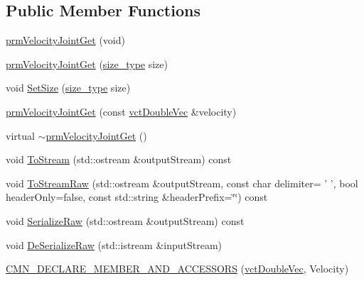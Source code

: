\subsection*{Public Member Functions}
\begin{DoxyCompactItemize}
\item 
\hyperlink{classprm_velocity_joint_get_aadaa15924d96f4554b4c56c217a40ab9}{prm\-Velocity\-Joint\-Get} (void)
\item 
\hyperlink{classprm_velocity_joint_get_a69b1b5351d0ab6165b0409acbc32f6ff}{prm\-Velocity\-Joint\-Get} (\hyperlink{classprm_velocity_joint_get_af8a1c509111e5ac2e38dfe32bc6d9914}{size\-\_\-type} size)
\item 
void \hyperlink{classprm_velocity_joint_get_a7b006c7b4877bc284ebeed3dede08165}{Set\-Size} (\hyperlink{classprm_velocity_joint_get_af8a1c509111e5ac2e38dfe32bc6d9914}{size\-\_\-type} size)
\item 
\hyperlink{classprm_velocity_joint_get_a78a442376fb1f0dcd131ef37a11401b7}{prm\-Velocity\-Joint\-Get} (const \hyperlink{vct_dynamic_vector_types_8h_ade4b3068c86fb88f41af2e5187e491c2}{vct\-Double\-Vec} \&velocity)
\item 
virtual \hyperlink{classprm_velocity_joint_get_a6e07f92c33daf27a7c5e70a179cc94ba}{$\sim$prm\-Velocity\-Joint\-Get} ()
\item 
void \hyperlink{classprm_velocity_joint_get_ad6b47ae25d5023f1b388dc3b5ee7e5c4}{To\-Stream} (std\-::ostream \&output\-Stream) const 
\item 
void \hyperlink{classprm_velocity_joint_get_aa30c7cd787323214de8f7b1775af95d8}{To\-Stream\-Raw} (std\-::ostream \&output\-Stream, const char delimiter= ' ', bool header\-Only=false, const std\-::string \&header\-Prefix=\char`\"{}\char`\"{}) const 
\item 
void \hyperlink{classprm_velocity_joint_get_a12a777066c57f49dcbfbe4ae6c4ccf33}{Serialize\-Raw} (std\-::ostream \&output\-Stream) const 
\item 
void \hyperlink{classprm_velocity_joint_get_a8a6a0f5889b11870aa79a8c6e375de67}{De\-Serialize\-Raw} (std\-::istream \&input\-Stream)
\end{DoxyCompactItemize}
{\bf }\par
\begin{DoxyCompactItemize}
\item 
\hyperlink{classprm_velocity_joint_get_a83e512377e6dc7aeb167e57d87429f72}{C\-M\-N\-\_\-\-D\-E\-C\-L\-A\-R\-E\-\_\-\-M\-E\-M\-B\-E\-R\-\_\-\-A\-N\-D\-\_\-\-A\-C\-C\-E\-S\-S\-O\-R\-S} (\hyperlink{vct_dynamic_vector_types_8h_ade4b3068c86fb88f41af2e5187e491c2}{vct\-Double\-Vec}, Velocity)
\end{DoxyCompactItemize}



